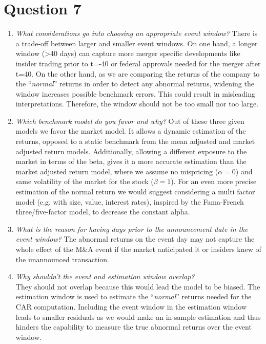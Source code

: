 \documentclass[11pt,a4paper,openany,oneside]{article}%
\begin{document}
\section{Question 7}
\begin{enumerate}[label=\alph*),leftmargin=*]

\item \textit{What considerations go into choosing an appropriate event window?} \newline
There is a trade-off between larger and smaller event windows. On one hand, a longer window (>40 days) can capture more merger specific developments like insider trading prior to t=-40 or federal approvals needed for the merger after t=40. On the other hand, as we are comparing the returns of the company to the “\textit{normal}” returns in order to detect any abnormal returns, widening the window increases possible benchmark errors. This could result in misleading interpretations. Therefore, the window should not be too small nor too large.
\item \textit{Which benchmark model do you favor and why?}\newline
Out of these three given models we favor the market model. It allows a dynamic estimation of the returns, opposed to a static benchmark from the mean adjusted and market adjusted return models. Additionally, allowing a different exposure to the market in terms of the beta, gives it a more accurate estimation than the market adjusted return model, where we assume no mispricing ($\alpha= 0$) and same volatility of the market for the stock ($\beta= 1$). For an even more precise estimation of the normal return we would suggest considering a multi factor model (e.g. with size, value, interest rates), inspired by the Fama-French three/five-factor model, to decrease the constant alpha.
\item \textit{What is the reason for having days prior to the announcement date in the event window?}\newline
The abnormal returns on the event day may not capture the whole effect of the M\&A event if the market anticipated it or insiders knew of the unannounced transaction.
\item \textit{Why shouldn’t the event and estimation window overlap?}\\
They should not overlap because this would lead the model to be biased. The estimation window is used to estimate the “\textit{normal}” returns needed for the CAR computation. Including the event window in the estimation window leads to smaller residuals as we would make an in-sample estimation and thus hinders the capability to measure the true abnormal returns over the event window.

\end{enumerate}
\end{document}
